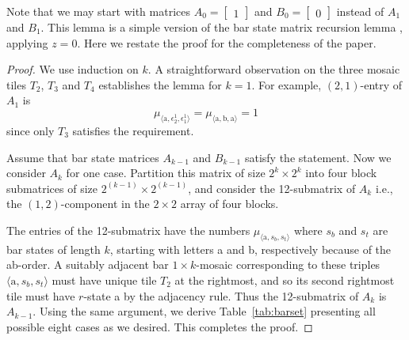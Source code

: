 \documentclass[11pt,a4paper]{amsart}
\begin{document}
Note that we may start with matrices 
$A_0 = \begin{bmatrix} 1 \end{bmatrix}$ and $B_0 = \begin{bmatrix} 0 \end{bmatrix}$
instead of $A_1$ and $B_1$.
This lemma is a simple version of the bar state matrix recursion lemma \cite[Lemma 7]{OhD1},
applying $z=0$.
Here we restate the proof for the completeness of the paper.

\begin{proof}
We use induction on $k$.
A straightforward observation on the three mosaic tiles $T_2$, $T_3$ and $T_4$
establishes the lemma for $k=1$.
For example, $(2,1)$-entry of $A_1$ is 
$$ \mu_{\langle \text{a}, \epsilon^1_2, \epsilon^1_1 \rangle} = 
\mu_{\langle \text{a}, \text{b}, \text{a} \rangle} = 1 $$ 
since only $T_3$ satisfies the requirement.

Assume that bar state matrices $A_{k-1}$ and $B_{k-1}$ satisfy the statement.
Now we consider $A_k$ for one case.
Partition this matrix of size $2^k \! \times \! 2^k$
into four block submatrices of size $2^{(k-1)} \! \times \! 2^{(k-1)}$, 
and consider the 12-submatrix of $A_k$ 
i.e., the $(1,2)$-component in the $2 \! \times \! 2$ array of four blocks.

The entries of the 12-submatrix have the numbers $\mu_{\langle \text{a}, s_b, s_t \rangle}$ 
where $s_b$ and $s_t$ are bar states of length $k$, starting with letters a and b, respectively because of the ab-order.
A suitably adjacent bar $1 \! \times \! k$-mosaic corresponding to these triples 
$\langle \text{a}, s_b, s_t \rangle$ must have unique tile $T_2$ at the rightmost,
and so its second rightmost tile must have $r$-state a by the adjacency rule.
Thus the 12-submatrix of $A_{k}$ is $A_{k-1}$.
Using the same argument, we derive Table~\ref{tab:barset} presenting all possible eight cases as we desired.
This completes the proof.
\end{proof}
\end{document}
